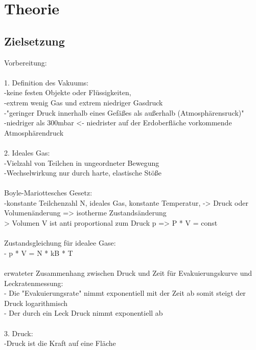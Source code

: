 \section{Theorie}

    \subsection{Zielsetzung}

       
Vorbereitung: \\
\\
	1. Definition des Vakuums:\\
		-keine festen Objekte oder Flüssigkeiten,\\
                -extrem wenig Gas und extrem niedriger Gasdruck\\
                -"geringer Druck innerhalb eines Gefäßes als außerhalb (Atmosphärensruck)"\\
                -niedriger als 300mbar <- niedrister auf der Erdoberfläche vorkommende Atmosphärendruck\\
\\
	2. Ideales Gas:\\
		-Vielzahl von Teilchen in ungeordneter Bewegung\\
		-Wechselwirkung nur durch harte, elastische Stöße\\
\\
	   Boyle-Mariottesches Gesetz:\\
		-konstante Teilchenzahl N, ideales Gas, konstante Temperatur, -> Druck oder Volumenänderung => isotherme Zustandsänderung\\
		 \-> Volumen V ist anti proportional zum Druck p => P * V = const \\
\\
	   Zustandsgleichung für idealee Gase:\\
		- p * V = N * kB * T\\
\\
	   erwateter Zusammenhang zwischen Druck und Zeit für Evakuierungskurve und Leckratenmessung:\\
	   	- Die "Evakuierungsrate" nimmt exponentiell mit der Zeit ab somit steigt der Druck logarithmisch\\
		- Der durch ein Leck Druck nimmt exponentiell ab\\
\\
	3. Druck:\\
		-Druck ist die Kraft auf eine Fläche\\
\\
